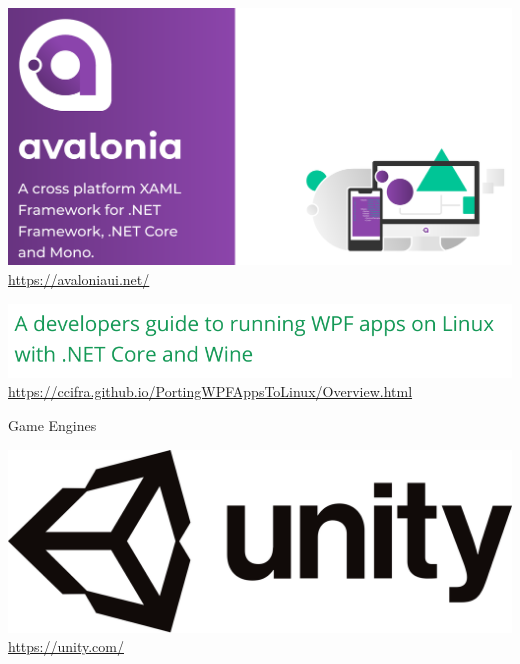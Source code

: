 \documentclass[utf8x]{beamer}
\begin{document}
\begin{frame}
    \centering
    \includegraphics[width=\textwidth]{avalonia.png}
    \tiny\url{https://avaloniaui.net/}
\end{frame}

\begin{frame}
    \centering
    \includegraphics[width=\textwidth]{wine.png}
    \tiny\url{https://ccifra.github.io/PortingWPFAppsToLinux/Overview.html}
\end{frame}


\begin{frame}
    \begin{center}
        \LARGE \textrm{Game Engines}
    \end{center}
\end{frame}

\begin{frame}
    \centering
    \includegraphics[width=\textwidth]{unity.png}
    \tiny\url{https://unity.com/}
\end{frame}
\end{document}
